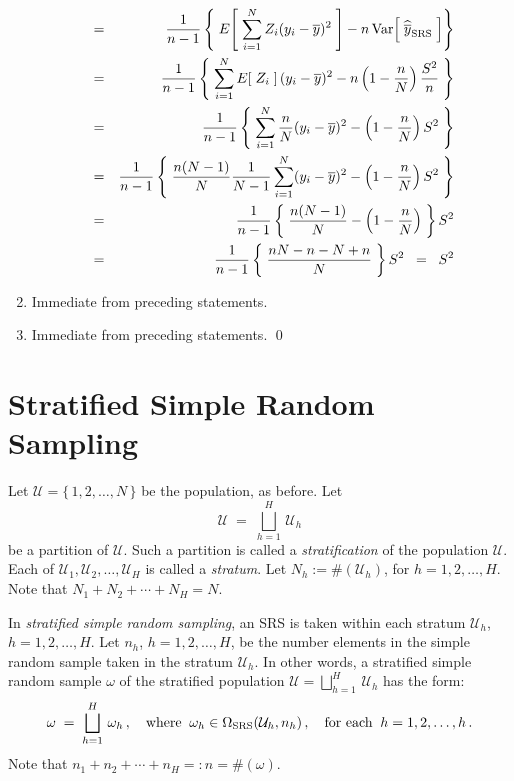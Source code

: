 \documentclass{article}
\begin{document}
\begin{enumerate}
\begin{eqnarray*}
              & = &  \dfrac{1}{n-1}\left\{\;E\!\left[\; \sum_{i=1}^{N}Z_{i}(y_{i}-\overline{y})^{2} \;\right]
                          - n\,\textnormal{Var}\!\left[\;\widehat{\overline{y}}_{\textnormal{SRS}}\;\right] \right\} \\
              & = &  \dfrac{1}{n-1}\left\{\; \sum_{i=1}^{N} E\!\left[\; Z_{i} \;\right] (y_{i}-\overline{y})^{2}
                          - n\left(1-\dfrac{n}{N}\right)\dfrac{S^{2}}{n} \; \right\} \\
              & = &  \dfrac{1}{n-1}\left\{\;\sum_{i=1}^{N} \dfrac{n}{N} (y_{i}-\overline{y})^{2}
                          - \left(1-\dfrac{n}{N}\right)S^{2}\;\right\} \\
              & = &  \dfrac{1}{n-1}\left\{\;\dfrac{n(N-1)}{N}\dfrac{1}{N-1}\sum_{i=1}^{N} (y_{i}-\overline{y})^{2}
                          - \left(1-\dfrac{n}{N}\right)S^{2}\;\right\} \\
              & = &  \dfrac{1}{n-1}\left\{\;\dfrac{n(N-1)}{N} - \left(1-\dfrac{n}{N}\right)\;\right\} S^{2} \\
              & = &  \dfrac{1}{n-1}\left\{\;\dfrac{nN-n-N+n}{N}\;\right\} S^{2} \;\; = \;\; S^{2}
          \end{eqnarray*}
\item  Immediate from preceding statements.
\item  Immediate from preceding statements. \qed
\end{enumerate}


\section{Stratified Simple Random Sampling}
\setcounter{theorem}{0}

Let $\mathcal{U} = \{\,1,2,\ldots,N\,\}$ be the population, as before.  Let
\begin{equation*}
    \mathcal{U} \; = \; \bigsqcup_{h=1}^{H}\,\mathcal{U}_{h}
\end{equation*}
be a partition of $\mathcal{U}$.  Such a partition is called a \emph{stratification} of the population $\mathcal{U}$.
Each of $\mathcal{U}_{1}, \mathcal{U}_{2}, \ldots, \mathcal{U}_{H}$ is called a \emph{stratum}.
Let $N_{h} := \#\!\left(\mathcal{U}_{h}\right)$, for $h=1,2,\ldots,H$.  Note that $N_{1}+N_{2}+\cdots+N_{H} = N$.

In \emph{stratified simple random sampling}, an SRS is taken within each stratum $\mathcal{U}_{h}$, $h=1,2,\ldots,H$.
Let $n_{h}$, $h = 1,2,\ldots,H$, be the number elements in the simple random sample taken in the stratum $\mathcal{U}_{h}$.
In other words, a stratified simple random sample $\omega$ of the stratified population $\mathcal{U} = \bigsqcup_{h=1}^{H}\,\mathcal{U}_{h}$ has the form:
\begin{equation*}
     \omega \; = \; \bigsqcup_{h=1}^{H}\,\omega_{h}\,,
     \quad\textnormal{where}\;\; \omega_{h} \in \Omega_{\textnormal{SRS}}(\mathcal{U}_{h},n_{h})\,,
     \quad\textnormal{for each}\;\; h = 1,2,\ldots,h\,.
\end{equation*}
Note that $n_{1} + n_{2} + \cdots + n_{H} =: n = \#\!(\omega)$.
\end{document}
